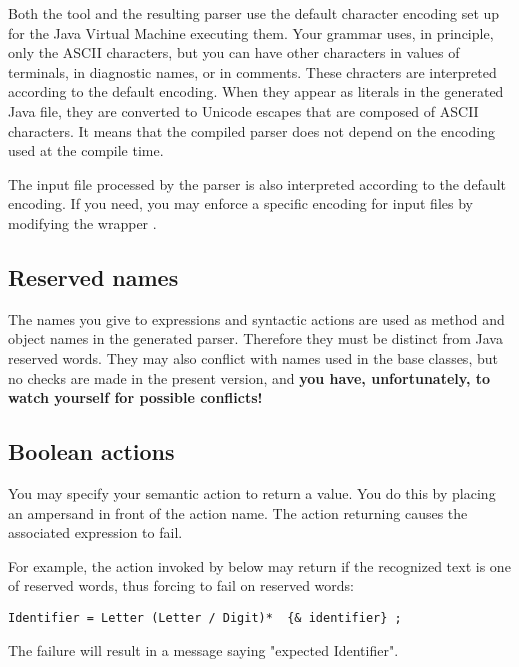 Both the  tool and the resulting parser use the default 
character encoding set up for the Java Virtual Machine executing them.
%
Your grammar uses, in principle, only the ASCII characters, 
but you can have other characters in values of terminals, 
in diagnostic names, or in comments.
These chracters are interpreted according to the default encoding.
When they appear as literals in the generated Java file,
they are converted to Unicode escapes that are composed of ASCII characters.
It means that the compiled parser does not depend on the 
encoding used at the compile time.

The input file processed by the parser is also interpreted 
according to the default encoding.
If you need, you may enforce a specific encoding for input files
by modifying the wrapper .


\subsection{Reserved names}

The names you give to expressions and syntactic actions are used as  
method and object names in the generated parser.
Therefore they must be distinct from Java reserved words.
They may also conflict with names used in the base classes,
but no checks are made in the present version, and
\textbf{you have, unfortunately, to watch yourself for possible conflicts!}
 

\subsection{Boolean actions\label{BoolAct}}

You may specify your semantic action to return a  value.
You do this by placing an ampersand in front of the action name.
The action returning  causes the associated expression to fail.

For example, the action  invoked by  below
may return  if the recognized text is one of reserved words,
thus forcing  to fail on reserved words:

\small
\begin{Verbatim}[frame=single,framesep=2mm,samepage=true,xleftmargin=15mm,xrightmargin=15mm,baselinestretch=0.8]
   Identifier = Letter (Letter / Digit)*  {& identifier} ;
\end{Verbatim}
\normalsize

The failure will result in a message saying "expected Identifier".


